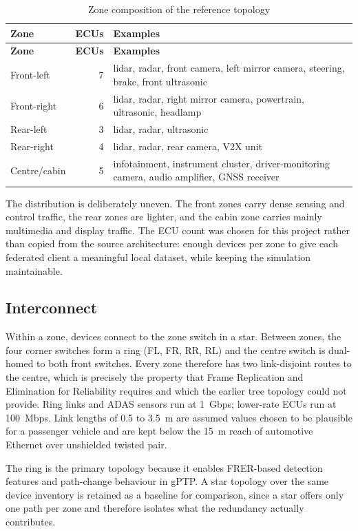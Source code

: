 \begin{longtable}{p{} r p{}}
\caption{Zone composition of the reference topology}\label{tab:topology5}\\
\toprule
\textbf{Zone} & \textbf{ECUs} & \textbf{Examples} \\
\midrule
\endfirsthead
\toprule
\textbf{Zone} & \textbf{ECUs} & \textbf{Examples} \\
\midrule
\endhead
Front-left & 7 & lidar, radar, front camera, left mirror camera, steering, brake,
front ultrasonic \\
Front-right & 6 & lidar, radar, right mirror camera, powertrain, ultrasonic,
headlamp \\
Rear-left & 3 & lidar, radar, ultrasonic \\
Rear-right & 4 & lidar, radar, rear camera, V2X unit \\
Centre/cabin & 5 & infotainment, instrument cluster, driver-monitoring camera,
audio amplifier, GNSS receiver \\
\bottomrule
\end{longtable}

The distribution is deliberately uneven. The front zones carry dense sensing and
control traffic, the rear zones are lighter, and the cabin zone carries mainly
multimedia and display traffic. The ECU count was chosen for this project rather than
copied from the source architecture: enough devices per zone to give each federated
client a meaningful local dataset, while keeping the simulation maintainable.

\subsection{Interconnect}
Within a zone, devices connect to the zone switch in a star. Between zones, the four
corner switches form a ring (FL, FR, RR, RL) and the centre switch is dual-homed to
both front switches. Every zone therefore has two link-disjoint routes to the centre,
which is precisely the property that Frame Replication and Elimination for Reliability
requires and which the earlier tree topology could not provide. Ring links and ADAS
sensors run at 1~Gbps; lower-rate ECUs run at 100~Mbps. Link lengths of 0.5 to 3.5~m
are assumed values chosen to be plausible for a passenger vehicle and are kept below
the 15~m reach of automotive Ethernet over unshielded twisted pair.

The ring is the primary topology because it enables FRER-based detection features and
path-change behaviour in gPTP. A star topology over the same device inventory is
retained as a baseline for comparison, since a star offers only one path per zone and
therefore isolates what the redundancy actually contributes.

